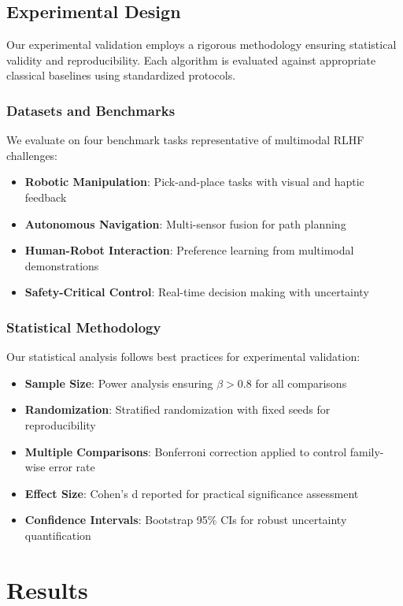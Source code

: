 \documentclass[fleqn,10pt]{wlscirep}
\begin{document}
\subsection{Experimental Design}

Our experimental validation employs a rigorous methodology ensuring statistical validity and reproducibility. Each algorithm is evaluated against appropriate classical baselines using standardized protocols.

\subsubsection{Datasets and Benchmarks}

We evaluate on four benchmark tasks representative of multimodal RLHF challenges:
\begin{itemize}
\item \textbf{Robotic Manipulation}: Pick-and-place tasks with visual and haptic feedback
\item \textbf{Autonomous Navigation}: Multi-sensor fusion for path planning
\item \textbf{Human-Robot Interaction}: Preference learning from multimodal demonstrations  
\item \textbf{Safety-Critical Control}: Real-time decision making with uncertainty
\end{itemize}

\subsubsection{Statistical Methodology}

Our statistical analysis follows best practices for experimental validation:
\begin{itemize}
\item \textbf{Sample Size}: Power analysis ensuring $\beta > 0.8$ for all comparisons
\item \textbf{Randomization}: Stratified randomization with fixed seeds for reproducibility
\item \textbf{Multiple Comparisons}: Bonferroni correction applied to control family-wise error rate
\item \textbf{Effect Size}: Cohen's d reported for practical significance assessment
\item \textbf{Confidence Intervals}: Bootstrap 95\% CIs for robust uncertainty quantification
\end{itemize}

\section{Results}
\end{document}
